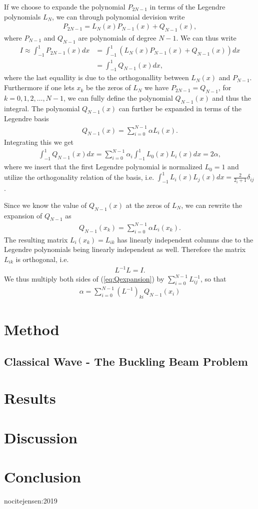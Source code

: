 \documentclass[twocolumn]{aastex62}
\begin{document}
If we choose to expande the polynomial $P_{2N-1}$ in terms of the Legendre polynomials $L_N$, we can through polynomial devision write 
\begin{align}
	P_{2N-1} = L_N(x)P_{N-1}(x) + Q_{N-1}(x),
\end{align}
where $P_{N-1}$ and $Q_{N-1}$ are polynomials of degree $N-1$. We can thus write 
\begin{align}
	I \approx \int^1_{-1} P_{2N-1}(x) dx &= \int^1_{-1} (L_N(x)P_{N-1}(x) + Q_{N-1}(x))dx \\
	&= \int^1_{-1}Q_{N-1}(x)dx,
\end{align}
where the last equallity is due to the orthogonallity between $L_N(x)$ and $P_{N-1}$. Furthermore if one lets $x_k$ be the zeros of $L_N$ we have $P_{2N-1} = Q_{N-1}$, for $k = 0, 1, 2,\ldots, N-1$, we can fully define the polynomial $Q_{N-1}(x)$ and thus the integral. The polynomial $Q_{N-1}(x)$ can further be expanded in terms of the Legendre basis 
\begin{align}
	Q_{N-1}(x) = \sum^{N-1}_{i=0} \alpha L_i(x).
\end{align}
Integrating this we get
\begin{align}
	\int^1_{-1}Q_{N-1}(x)dx = \sum^{N-1}_{i=0} \alpha_i\int^1_{-1}L_0(x)L_i(x) dx = 2\alpha,
\end{align}
where we insert that the first Legendre polynomial is normalized $L_0 = 1$ and utilize the orthogonality relation of the basis, i.e. $\int^1_{-1}L_i(x)L_j(x)dx = \frac{2}{2_i + 1}\delta_{ij}$.

Since we know the value of $Q_{N-1}(x)$ at the zeros of $L_N$, we can rewrite the expansion of $Q_{N-1}$ as
\begin{align}
	Q_{N-1} (x_k)= \sum^{N-1}_{i=0} \alpha L_i(x_k).
	\label{eq:Qexpansion}
\end{align}
The resulting matrix $L_i(x_k) = L_{ik}$ has linearly independent columns due to the Legendre polynomials being linearly independent as well. Therefore the matrix $L_{ik}$ is orthogonal, i.e.
\begin{align}
	L^{-1}L = I.
\end{align}
We thus multiply both sides of (\ref{eq:Qexpansion}) by $\sum^{N-1}_{i=0}L^{-1}_{ij}$, so that 
\begin{align}
	\alpha = \sum_{i=0}^{N-1} (L^{-1})_{ki}Q_{N-1}(x_i)
\end{align}

\section{Method} \label{sec:method}
\subsection{Classical Wave - The Buckling Beam Problem}

\section{Results} \label{sec:results}
\section{Discussion} \label{sec:discussion}
\section{Conclusion} \label{sec:conclusion}

nocite{jensen:2019}


\end{document}
